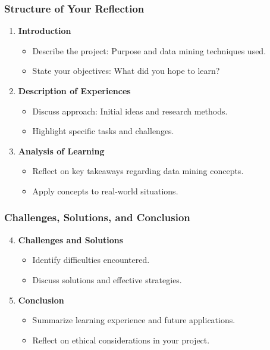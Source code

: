 \documentclass[aspectratio=169]{beamer}
\begin{document}
\begin{frame}[fragile]
    \frametitle{Structure of Your Reflection}
    \begin{enumerate}
        \item \textbf{Introduction}
            \begin{itemize}
                \item Describe the project: Purpose and data mining techniques used.
                \item State your objectives: What did you hope to learn?
            \end{itemize}
        \item \textbf{Description of Experiences}
            \begin{itemize}
                \item Discuss approach: Initial ideas and research methods.
                \item Highlight specific tasks and challenges.
            \end{itemize}
        \item \textbf{Analysis of Learning}
            \begin{itemize}
                \item Reflect on key takeaways regarding data mining concepts.
                \item Apply concepts to real-world situations.
            \end{itemize}
    \end{enumerate}
\end{frame}

\begin{frame}[fragile]
    \frametitle{Challenges, Solutions, and Conclusion}
    \begin{enumerate}
        \setcounter{enumi}{3}
        \item \textbf{Challenges and Solutions}
            \begin{itemize}
                \item Identify difficulties encountered.
                \item Discuss solutions and effective strategies.
            \end{itemize}
        \item \textbf{Conclusion}
            \begin{itemize}
                \item Summarize learning experience and future applications.
                \item Reflect on ethical considerations in your project.
            \end{itemize}
    \end{enumerate}
\end{frame}
\end{document}
